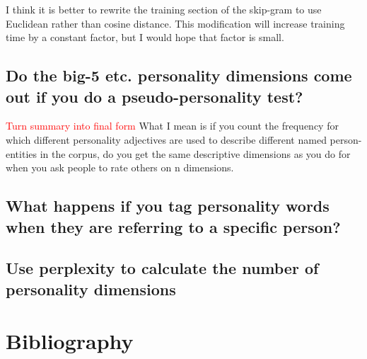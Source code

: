 \documentclass[10pt,letterpaper]{article}
\newcommand{\todo}[1]{\textcolor{red}{#1}}
\begin{document}
I think it is better to rewrite the training section of the skip-gram to use Euclidean rather than cosine distance. This modification will increase training time by a constant factor, but I would hope that factor is small.

\subsection{Do the big-5 etc. personality dimensions come out if you do a pseudo-personality test?}
\todo{Turn summary into final form}
What I mean is if you count the frequency for which different personality adjectives are used to describe different named person-entities in the corpus, do you get the same descriptive dimensions as you do for when you ask people to rate others on n dimensions.

\subsection{What happens if you tag personality words when they are referring to a specific person?}

\subsection{Use perplexity to calculate the number of personality dimensions}


\section{Bibliography}


\end{document}

